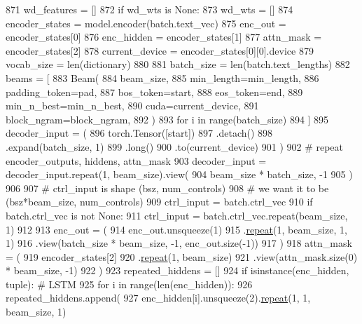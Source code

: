 \begin{DoxyCode}
871             wd\_features = []
872         \textcolor{keywordflow}{if} wd\_wts \textcolor{keywordflow}{is} \textcolor{keywordtype}{None}:
873             wd\_wts = []
874         encoder\_states = model.encoder(batch.text\_vec)
875         enc\_out = encoder\_states[0]
876         enc\_hidden = encoder\_states[1]
877         attn\_mask = encoder\_states[2]
878         current\_device = encoder\_states[0][0].device
879         vocab\_size = len(dictionary)
880 
881         batch\_size = len(batch.text\_lengths)
882         beams = [
883             Beam(
884                 beam\_size,
885                 min\_length=min\_length,
886                 padding\_token=pad,
887                 bos\_token=start,
888                 eos\_token=end,
889                 min\_n\_best=min\_n\_best,
890                 cuda=current\_device,
891                 block\_ngram=block\_ngram,
892             )
893             \textcolor{keywordflow}{for} i \textcolor{keywordflow}{in} range(batch\_size)
894         ]
895         decoder\_input = (
896             torch.Tensor([start])
897             .detach()
898             .expand(batch\_size, 1)
899             .long()
900             .to(current\_device)
901         )
902         \textcolor{comment}{# repeat encoder\_outputs, hiddens, attn\_mask}
903         decoder\_input = decoder\_input.repeat(1, beam\_size).view(
904             beam\_size * batch\_size, -1
905         )
906 
907         \textcolor{comment}{# ctrl\_input is shape (bsz, num\_controls)}
908         \textcolor{comment}{# we want it to be (bsz*beam\_size, num\_controls)}
909         ctrl\_input = batch.ctrl\_vec
910         \textcolor{keywordflow}{if} batch.ctrl\_vec \textcolor{keywordflow}{is} \textcolor{keywordflow}{not} \textcolor{keywordtype}{None}:
911             ctrl\_input = batch.ctrl\_vec.repeat(beam\_size, 1)
912 
913         enc\_out = (
914             enc\_out.unsqueeze(1)
915             .\hyperlink{namespacerepeat}{repeat}(1, beam\_size, 1, 1)
916             .view(batch\_size * beam\_size, -1, enc\_out.size(-1))
917         )
918         attn\_mask = (
919             encoder\_states[2]
920             .\hyperlink{namespacerepeat}{repeat}(1, beam\_size)
921             .view(attn\_mask.size(0) * beam\_size, -1)
922         )
923         repeated\_hiddens = []
924         \textcolor{keywordflow}{if} isinstance(enc\_hidden, tuple):  \textcolor{comment}{# LSTM}
925             \textcolor{keywordflow}{for} i \textcolor{keywordflow}{in} range(len(enc\_hidden)):
926                 repeated\_hiddens.append(
927                     enc\_hidden[i].unsqueeze(2).\hyperlink{namespacerepeat}{repeat}(1, 1, beam\_size, 1)

\end{DoxyCode}
